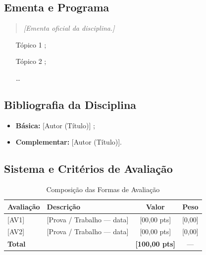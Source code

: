 \documentclass[12pt]{article}
\newif\ifmostrarinstrucoes
\newcommand{\instrucao}[1]{%
  \ifmostrarinstrucoes
  \begin{tcolorbox}[colback=instrbg, colframe=dccblue, arc=2mm, boxrule=0.6pt,
    title=\textbf{INSTRUÇÃO (apagar na versão final)}, fonttitle=\small]
  \small #1
  \end{tcolorbox}
  \fi}
\begin{document}
\subsection{Ementa e Programa}
\instrucao{Copie a ementa oficial e liste os tópicos do programa da disciplina.}
\begin{quote}\textit{[Ementa oficial da disciplina.]}\end{quote}
\begin{enumerate}[noitemsep, topsep=2pt]
    \item [Tópico 1];
    \item [Tópico 2];
    \item [\ldots]
\end{enumerate}

\subsection{Bibliografia da Disciplina}
\instrucao{Liste a bibliografia básica e complementar adotada. Cadastre cada obra em \texttt{bibliografia.bib} e cite com \texttt{\textbackslash cite\{chave\}}.}
\begin{itemize}[leftmargin=*]
    \item \textbf{Básica:} [Autor (Título)] \cite{exemplo_livro};
    \item \textbf{Complementar:} [Autor (Título)].
\end{itemize}

\subsection{Sistema e Critérios de Avaliação}
\instrucao{Descreva a composição da nota da disciplina e as datas das avaliações. Adapte a tabela abaixo (linhas, valores e pesos).}
\begin{table}[H]
\centering\small
\caption{Composição das Formas de Avaliação}\label{tab:avaliacoes}
\vspace{0.2cm}
\begin{tabular}{llcc}
\toprule
\textbf{Avaliação} & \textbf{Descrição} & \textbf{Valor} & \textbf{Peso} \\
\midrule
{[AV1]} & [Prova / Trabalho --- data] & [00,00 pts] & [0,00] \\
{[AV2]} & [Prova / Trabalho --- data] & [00,00 pts] & [0,00] \\
\midrule
\textbf{Total} & & \textbf{[100,00 pts]} & --- \\
\bottomrule
\end{tabular}
\end{table}
\end{document}
